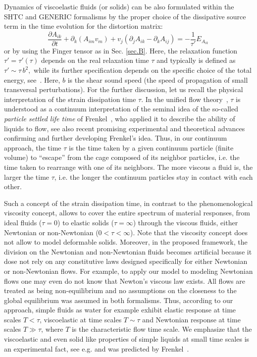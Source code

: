 \documentclass[twoside]{article}
\newcommand{\ted}{E} %
\newcommand{\pd}{\partial}
\begin{document}
Dynamics of viscoelastic fluids (or solids) can be also 
formulated within the 
SHTC and GENERIC formalisms by the proper choice of the dissipative source term 
in the time evolution for the distortion matrix:
\begin{equation}
	\frac{\pd A_{ik}}{\pd t} + \pd_k (A_{im} v_m) + v_j(\pd_j A_{ik} - \pd_k 
	A_{ij}) =-\frac{1}{\tau'}\ted_{A_{ik}}\,
\end{equation}
or by using the Finger tensor as in Sec. \ref{sec.B}.
Here, the relaxation function $ \tau' = \tau'(\tau) $ depends on the real 
relaxation time $ \tau $ and typically is defined as 
$\tau' \sim \tau\,b^2,$
while its further specification depends on the specific choice of the total 
energy, see~\cite{HPR2016,DPRZ2016}. Here, $ b $ is the shear sound speed (the 
speed of propagation of small transversal perturbations). For the further 
discussion, 
let us recall the physical interpretation of the strain dissipation time $ \tau 
$. In the unified flow theory~\cite{HPR2016,DPRZ2016,HYP2016}, $ \tau $ is 
understood as a continuum interpretation of the seminal idea 
of the so-called \textit{particle settled life time} of 
Frenkel~\cite{Frenkel1955}, who applied it to describe the ability of liquids 
to flow, see also recent promising experimental and theoretical 
advances~\cite{brazhkin2012two,bolmatov2013thermodynamic,bolmatov2015revealing,Bolmatov2015a,Bolmatov2016} confirming and further developing Frenkel's idea. 
Thus, in our continuum approach, the time $ \tau $ is the time taken by a given 
continuum particle (finite volume) to ``escape'' from the cage composed of its 
neighbor particles, 
i.e. the time taken to rearrange with one of its neighbors. The more viscous a 
fluid is, the larger the time $ \tau $, i.e. the longer the continuum  
particles stay in contact with each other. 

Such a concept of the strain 
dissipation time, in contrast to the phenomenological viscosity concept, allows 
to 
cover the entire spectrum of material responses, 
from ideal fluids ($ \tau = 0 $) to elastic solids ($ \tau = \infty $) through 
the viscous fluids, either Newtonian or non-Newtonian ($ 0 < \tau < \infty $). 
Note that the viscosity concept does not allow to model deformable solids. 
Moreover, in the proposed framework, the division on the Newtonian and 
non-Newtonian fluids becomes artificial because it dose not rely on any 
constitutive laws designed specifically for either Newtonian or non-Newtonian 
flows. For example, to apply our model to modeling Newtonian flows one may 
even do not know that Newton's viscous law exists. All flows are treated as 
being non-equilibrium and no assumptions 
on the closeness to the global equilibrium was assumed in both formalisms.
Thus, according to our approach, simple fluids as water for example exhibit 
elastic response at time scales $ T < \tau $, viscoelastic at time scales $ T 
\sim \tau $ and Newtonian response at time scales $ T \gg \tau $, where $ T $ 
is the characteristic flow time scale. We emphasize that the viscoelastic and 
even solid like properties of simple liquids at small time scales is an 
experimental 
fact, see e.g. 
\cite{brazhkin2012two,bolmatov2013thermodynamic,bolmatov2015revealing,Bolmatov2015a,Bolmatov2016} and was predicted by Frenkel~\cite{Frenkel1955}.
 
\end{document}
